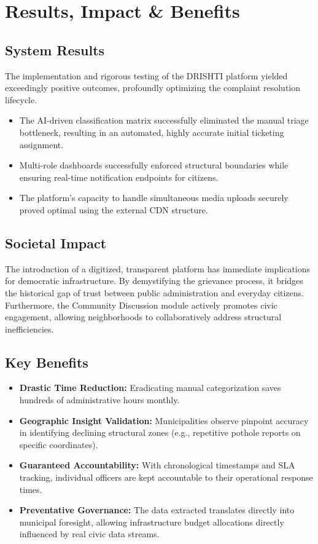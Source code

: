 \documentclass[12pt,a4paper]{report}
\begin{document}
\chapter{Results, Impact \& Benefits}

\section{System Results}
The implementation and rigorous testing of the DRISHTI platform yielded exceedingly positive outcomes, profoundly optimizing the complaint resolution lifecycle. 
\begin{itemize}
    \item The AI-driven classification matrix successfully eliminated the manual triage bottleneck, resulting in an automated, highly accurate initial ticketing assignment.
    \item Multi-role dashboards successfully enforced structural boundaries while ensuring real-time notification endpoints for citizens.
    \item The platform’s capacity to handle simultaneous media uploads securely proved optimal using the external CDN structure.
\end{itemize}

\section{Societal Impact}
The introduction of a digitized, transparent platform has immediate implications for democratic infrastructure. By demystifying the grievance process, it bridges the historical gap of trust between public administration and everyday citizens. Furthermore, the Community Discussion module actively promotes civic engagement, allowing neighborhoods to collaboratively address structural inefficiencies.

\section{Key Benefits}
\begin{itemize}
    \item \textbf{Drastic Time Reduction:} Eradicating manual categorization saves hundreds of administrative hours monthly.
    \item \textbf{Geographic Insight Validation:} Municipalities observe pinpoint accuracy in identifying declining structural zones (e.g., repetitive pothole reports on specific coordinates).
    \item \textbf{Guaranteed Accountability:} With chronological timestamps and SLA tracking, individual officers are kept accountable to their operational response times.
    \item \textbf{Preventative Governance:} The data extracted translates directly into municipal foresight, allowing infrastructure budget allocations directly influenced by real civic data streams.
\end{itemize}
\end{document}
